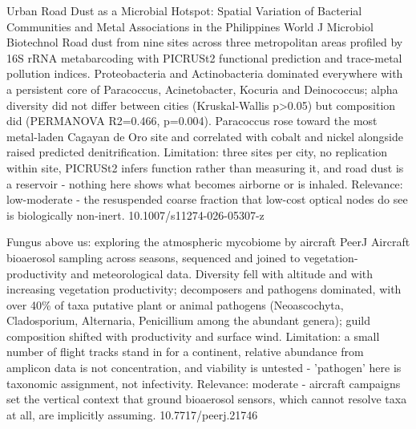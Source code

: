 \documentclass[10pt]{article}
\begin{document}
\par{}\baselineskip{}\baselineskip
{}

{Urban Road Dust as a Microbial Hotspot: Spatial Variation of Bacterial Communities and Metal Associations in the Philippines}
{World J Microbiol Biotechnol}
{Road dust from nine sites across three metropolitan areas profiled by 16S rRNA metabarcoding with PICRUSt2 functional prediction and trace-metal pollution indices. Proteobacteria and Actinobacteria dominated everywhere with a persistent core of Paracoccus, Acinetobacter, Kocuria and Deinococcus; alpha diversity did not differ between cities (Kruskal-Wallis p>0.05) but composition did (PERMANOVA R2=0.466, p=0.004). Paracoccus rose toward the most metal-laden Cagayan de Oro site and correlated with cobalt and nickel alongside raised predicted denitrification. Limitation: three sites per city, no replication within site, PICRUSt2 infers function rather than measuring it, and road dust is a reservoir - nothing here shows what becomes airborne or is inhaled. Relevance: low-moderate - the resuspended coarse fraction that low-cost optical nodes do see is biologically non-inert.}
{10.1007/s11274-026-05307-z}

\par{}\baselineskip{}\baselineskip
{}

{Fungus above us: exploring the atmospheric mycobiome by aircraft}
{PeerJ}
{Aircraft bioaerosol sampling across seasons, sequenced and joined to vegetation-productivity and meteorological data. Diversity fell with altitude and with increasing vegetation productivity; decomposers and pathogens dominated, with over 40\% of taxa putative plant or animal pathogens (Neoascochyta, Cladosporium, Alternaria, Penicillium among the abundant genera); guild composition shifted with productivity and surface wind. Limitation: a small number of flight tracks stand in for a continent, relative abundance from amplicon data is not concentration, and viability is untested - 'pathogen' here is taxonomic assignment, not infectivity. Relevance: moderate - aircraft campaigns set the vertical context that ground bioaerosol sensors, which cannot resolve taxa at all, are implicitly assuming.}
{10.7717/peerj.21746}

\par{}\baselineskip{}\baselineskip
{}
\end{document}
